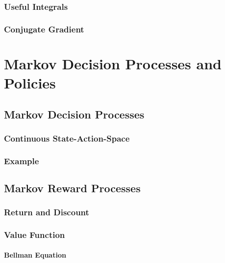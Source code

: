 		\subsection{Useful Integrals} %

		\subsection{Conjugate Gradient} %

\chapter{Markov Decision Processes and Policies} %

	\section{Markov Decision Processes} %

		\subsection{Continuous State-Action-Space} %

		\subsection{Example} %

	\section{Markov Reward Processes} %

		\subsection{Return and Discount} %

		\subsection{Value Function} %

			\subsubsection{Bellman Equation} %

